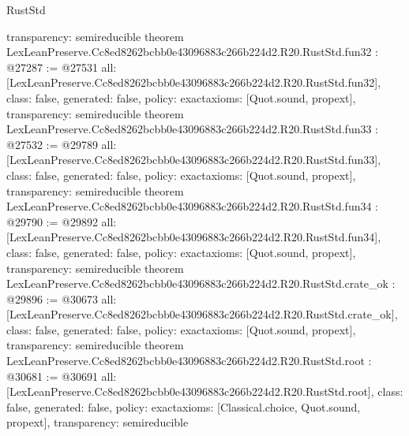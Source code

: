 \begin{lexlean}{RustStd}
\begin{coremodule}
{  transparency: semireducible
}
theorem LexLeanPreserve.Cc8ed8262bcbb0e43096883c266b224d2.R20.RustStd.fun32 : @27287 := @27531 {
  all: [LexLeanPreserve.Cc8ed8262bcbb0e43096883c266b224d2.R20.RustStd.fun32],
  class: false,
  generated: false,
  policy: exact{axioms: [Quot.sound, propext]},
  transparency: semireducible
}
theorem LexLeanPreserve.Cc8ed8262bcbb0e43096883c266b224d2.R20.RustStd.fun33 : @27532 := @29789 {
  all: [LexLeanPreserve.Cc8ed8262bcbb0e43096883c266b224d2.R20.RustStd.fun33],
  class: false,
  generated: false,
  policy: exact{axioms: [Quot.sound, propext]},
  transparency: semireducible
}
theorem LexLeanPreserve.Cc8ed8262bcbb0e43096883c266b224d2.R20.RustStd.fun34 : @29790 := @29892 {
  all: [LexLeanPreserve.Cc8ed8262bcbb0e43096883c266b224d2.R20.RustStd.fun34],
  class: false,
  generated: false,
  policy: exact{axioms: [Quot.sound, propext]},
  transparency: semireducible
}
theorem LexLeanPreserve.Cc8ed8262bcbb0e43096883c266b224d2.R20.RustStd.crate_ok : @29896 := @30673 {
  all: [LexLeanPreserve.Cc8ed8262bcbb0e43096883c266b224d2.R20.RustStd.crate_ok],
  class: false,
  generated: false,
  policy: exact{axioms: [Quot.sound, propext]},
  transparency: semireducible
}
theorem LexLeanPreserve.Cc8ed8262bcbb0e43096883c266b224d2.R20.RustStd.root : @30681 := @30691 {
  all: [LexLeanPreserve.Cc8ed8262bcbb0e43096883c266b224d2.R20.RustStd.root],
  class: false,
  generated: false,
  policy: exact{axioms: [Classical.choice, Quot.sound, propext]},
  transparency: semireducible
}


\end{coremodule}
\end{lexlean}
